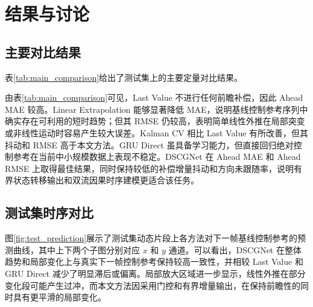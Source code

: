 \documentclass[journal]{IEEEtran}
\begin{document}
\section{结果与讨论}

\subsection{主要对比结果}
表\ref{tab:main_comparison}给出了测试集上的主要定量对比结果。

\begin{table}[!t]
\centering
\caption{主要方法对比（测试集）}
\label{tab:main_comparison}
\small
\setlength{\tabcolsep}{3pt}
\end{table}

由表\ref{tab:main_comparison}可见，Last Value 不进行任何前瞻补偿，因此 Ahead MAE 较高。Linear Extrapolation 能够显著降低 MAE，说明基线控制参考序列中确实存在可利用的短时趋势；但其 RMSE 仍较高，表明简单线性外推在局部突变或非线性运动时容易产生较大误差。Kalman CV 相比 Last Value 有所改善，但其抖动和 RMSE 高于本文方法。GRU Direct 虽具备学习能力，但直接回归绝对控制参考在当前中小规模数据上表现不稳定。DSCGNet 在 Ahead MAE 和 Ahead RMSE 上取得最佳结果，同时保持较低的补偿增量抖动和方向未跟随率，说明有界状态转移输出和双流因果时序建模更适合该任务。

\subsection{测试集时序对比}
图\ref{fig:test_prediction}展示了测试集动态片段上各方法对下一帧基线控制参考的预测曲线，其中上下两个子图分别对应 $x$ 和 $y$ 通道。可以看出，DSCGNet 在整体趋势和局部变化上与真实下一帧控制参考保持较高一致性，并相较 Last Value 和 GRU Direct 减少了明显滞后或偏离。局部放大区域进一步显示，线性外推在部分变化段可能产生过冲，而本文方法因采用门控和有界增量输出，在保持前瞻性的同时具有更平滑的局部变化。
\end{document}
